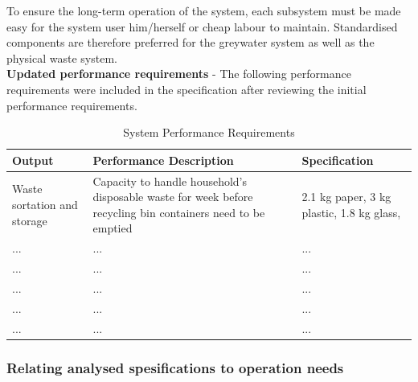 \documentclass[a4paper,11pt,fleqn]{report}
\begin{document}
To ensure the long-term operation of the system, each subsystem must be made easy for the system user him/herself or cheap labour to maintain. Standardised components are therefore preferred for the greywater system as well as the physical waste system. \\

\noindent\textbf{Updated performance requirements} -
The following performance requirements were included in the specification after reviewing the initial performance requirements.
%
\begin{table}[h!]
\caption {System Performance Requirements} \label{tb: Functional_SS_elements} 
\begin{center}
\begin{tabular}{p{3cm}|p{6cm}|p{5.5cm}}\toprule
	{\textbf{Output}} & {\textbf{Performance Description}} & {\textbf{Specification}}\\ \midrule
    \hline
   Waste sortation and storage & Capacity to handle household's disposable waste for week before recycling bin containers need to be emptied  & 2.1 kg paper, 3 kg plastic, 1.8 kg glass, \citep{Sithole2014}\\
        \hline
    ... & ... & ...\\
        \hline
    ... & ... & ...\\
        \hline
    ... & ... & ...\\
        \hline
    ... & ... & ...\\
        \hline
    ... & ... & ...\\

    \bottomrule
\end{tabular}
\end{center}
\end{table}
%

\subsubsection{Relating analysed spesifications to operation needs}
\end{document}
